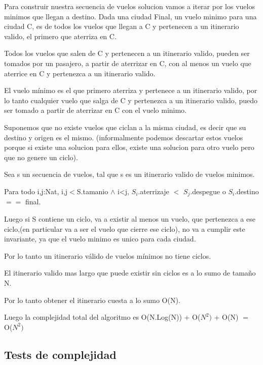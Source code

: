 Para construir nuestra secuencia de vuelos solucion vamos a iterar por los vuelos minimos que llegan a destino.
Dada una ciudad Final, un vuelo minimo para una ciudad C, es de todos los vuelos que llegan a C y pertenecen a un itinerario valido, el primero que aterriza en C. 

Todos los vuelos que salen de C y pertenecen a un itinerario valido, pueden ser tomados por un pasajero, a partir de aterrizar en C, con al menos un vuelo que aterrice en C y pertenezca a un itinerario valido.

El vuelo m\'inimo es el que primero aterriza y pertenece a un itinerario valido, por lo tanto cualquier vuelo que salga de C y pertenezca a un itinerario valido, puedo ser tomado a partir de aterrizar en C con el vuelo minimo.

Suponemos que no existe vuelos que ciclan a la misma ciudad, es decir que su destino y origen es el mismo. (informalmente podemos descartar estos vuelos porque si existe una solucion para ellos, existe una solucion para otro vuelo pero que no genere un ciclo).

Sea s un secuencia de vuelos, tal que s es un itinerario valido de vuelos minimos.

Para todo i,j:Nat, i,j$<$S.tamanio $\wedge$ i<j, $S_{i}$.aterrizaje $<$ $S_{j}$.despegue o $S_{i}$.destino $==$ final.

Luego si S contiene un ciclo, va a existir al menos un vuelo, que pertenezca a ese ciclo,(en particular va a ser el vuelo que cierre ese ciclo), no va a cumplir este invariante, ya que el vuelo minimo es unico para cada ciudad.

Por lo tanto un itinerario v\'alido de vuelos m\'inimos no tiene ciclos. 

El itinerario valido mas largo que puede existir sin ciclos es a lo sumo de tamaño N.

Por lo tanto obtener el itinerario cuesta a lo sumo O(N).


Luego la complejidad total del algoritmo es O(N.Log(N)) + O($N^{2})$ + O(N) $=$ O($N^{2})$
\subsection{Tests de complejidad}
